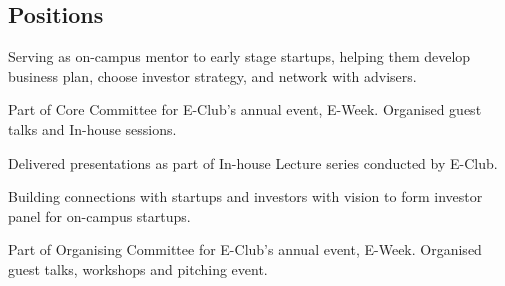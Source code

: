 \documentclass[]{deedy}
\begin{document}
\begin{minipage}[t]{0.69\textwidth}
\begin{flushleft}
\section{Positions}
%
\vspace{1.1pt}
\begin{tightemize}
\item Serving as on-campus mentor to early stage startups, helping them develop business plan, choose investor strategy, and network with advisers.
\item Part of Core Committee for E-Club’s annual event, E-Week. Organised guest talks and In-house sessions.
\item Delivered presentations as part of In-house Lecture series conducted by E-Club.
\end{tightemize}
\sectionsep
%
\vspace{1.1pt}
\begin{tightemize}
\item Building connections with startups and investors with vision to form investor panel for on-campus startups.
\item Part of Organising Committee for E-Club’s annual event, E-Week. Organised guest talks, workshops and pitching event.
\end{tightemize}
\sectionsep
%
\vspace{1.1pt}
\sectionsep
%
\end{flushleft}
\end{minipage}
\end{document}
